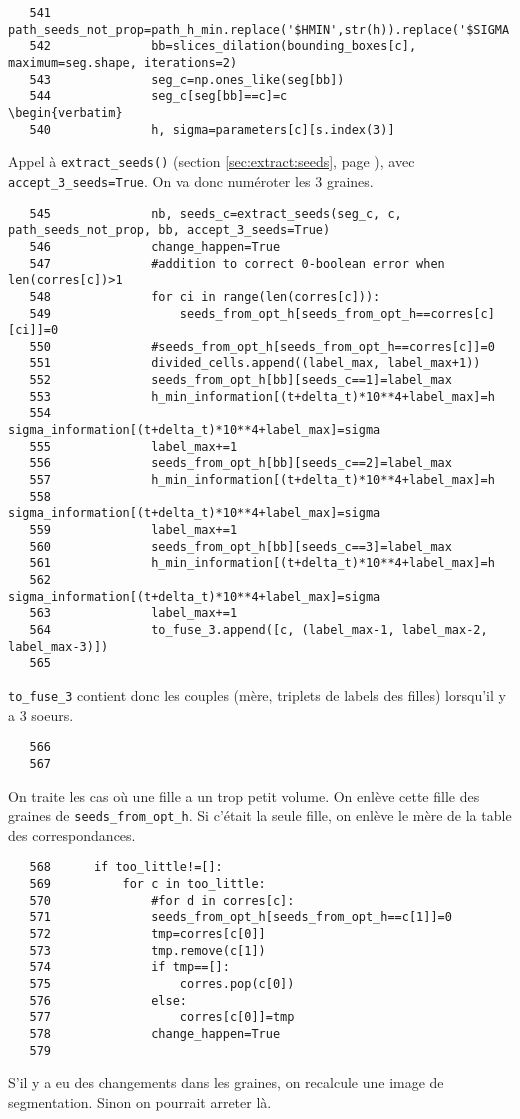 \documentclass{article}
\def \mycolor {red}
\begin{document}
\color{black}
\begin{verbatim} 
   541	            path_seeds_not_prop=path_h_min.replace('$HMIN',str(h)).replace('$SIGMA',str(sigma));
   542	            bb=slices_dilation(bounding_boxes[c], maximum=seg.shape, iterations=2)
   543	            seg_c=np.ones_like(seg[bb])
   544	            seg_c[seg[bb]==c]=c
\begin{verbatim} 
   540	            h, sigma=parameters[c][s.index(3)]
\end{verbatim} 
\color{\mycolor}
Appel \`a \texttt{extract\_seeds()} (section \ref{sec:extract:seeds}, page \pageref{sec:extract:seeds}), avec \verb| accept_3_seeds=True|. On va donc num\'eroter les 3 graines.
\color{black}
\begin{verbatim}
   545	            nb, seeds_c=extract_seeds(seg_c, c, path_seeds_not_prop, bb, accept_3_seeds=True)
   546	            change_happen=True
   547	            #addition to correct 0-boolean error when len(corres[c])>1
   548	            for ci in range(len(corres[c])):
   549	                seeds_from_opt_h[seeds_from_opt_h==corres[c][ci]]=0
   550	            #seeds_from_opt_h[seeds_from_opt_h==corres[c]]=0
   551	            divided_cells.append((label_max, label_max+1))
   552	            seeds_from_opt_h[bb][seeds_c==1]=label_max
   553	            h_min_information[(t+delta_t)*10**4+label_max]=h
   554	            sigma_information[(t+delta_t)*10**4+label_max]=sigma
   555	            label_max+=1
   556	            seeds_from_opt_h[bb][seeds_c==2]=label_max
   557	            h_min_information[(t+delta_t)*10**4+label_max]=h
   558	            sigma_information[(t+delta_t)*10**4+label_max]=sigma
   559	            label_max+=1
   560	            seeds_from_opt_h[bb][seeds_c==3]=label_max
   561	            h_min_information[(t+delta_t)*10**4+label_max]=h
   562	            sigma_information[(t+delta_t)*10**4+label_max]=sigma
   563	            label_max+=1
   564	            to_fuse_3.append([c, (label_max-1, label_max-2, label_max-3)])
   565	
\end{verbatim} 
\color{\mycolor}
\verb|to_fuse_3| contient donc les couples (m\`ere, triplets de labels des filles) lorsqu'il y a 3 soeurs.
\color{black}
\begin{verbatim}
   566	
   567	
\end{verbatim} 
\color{\mycolor}
On traite les cas o\`u une fille a un trop petit volume. On enl\`eve cette fille des graines de \verb|seeds_from_opt_h|. Si c'\'etait la seule fille, on enl\`eve le m\`ere de la table des correspondances.
\color{black}
\begin{verbatim}
   568	    if too_little!=[]:
   569	        for c in too_little:
   570	            #for d in corres[c]:
   571	            seeds_from_opt_h[seeds_from_opt_h==c[1]]=0
   572	            tmp=corres[c[0]]
   573	            tmp.remove(c[1])
   574	            if tmp==[]:
   575	                corres.pop(c[0])
   576	            else:
   577	                corres[c[0]]=tmp
   578	            change_happen=True
   579	
\end{verbatim} 
\color{\mycolor}
S'il y a eu des changements dans les graines, on recalcule une image de segmentation. Sinon on pourrait arreter l\`a.
\end{document}
